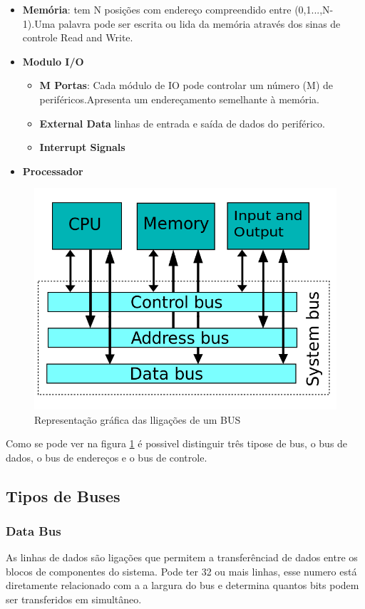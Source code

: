 \documentclass[10pt,a4paper]{paper}
\begin{document}
	\begin{itemize}
		\item \textbf{Memória}: tem N posições com endereço compreendido entre (0,1...,N-1).Uma palavra pode ser escrita ou lida da memória através dos sinas de controle Read and Write.
		\item \textbf{Modulo I/O}
		\begin{itemize}
			\item \textbf{M Portas}: Cada módulo de IO pode controlar um número (M) de periféricos.Apresenta um endereçamento semelhante à memória.
			\item \textbf{External Data}  linhas de entrada e saída de dados do periférico.
			\item \textbf{Interrupt Signals}
		\end{itemize}
		\item \textbf{Processador}
	\end{itemize}	
			
	\begin{figure}[ht]
		\includegraphics[scale=0.4]{fig1.png}
		\centering
		\caption{Representação gráfica das lligações de um BUS}
		\label{fig:figura 1}
	\end{figure}
	
	
Como se pode ver na figura \ref{fig:figura 1} é possivel distinguir três tipose de bus, o bus de dados, o bus de endereços e o bus de controle.

	\subsection*{Tipos de Buses}
	\subsubsection*{Data Bus}
	As linhas de dados são ligações que permitem a transferênciad de dados entre os blocos de componentes do sistema. Pode ter 32 ou mais linhas, esse numero está diretamente relacionado com a a largura do bus e determina quantos bits podem ser transferidos em simultâneo.
	
\end{document}
